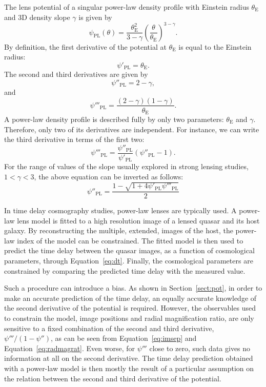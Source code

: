 \documentclass[usenatbib]{mnras}
\def\psiii{\psi''}
\def\psiiii{\psi'''}
\def\tein{\theta_{\mathrm{E}}}
\def\Sref#1{Section~\ref{#1}\xspace}
\def\Eref#1{Equation~\ref{#1}\xspace}
\begin{document}
The lens potential of a singular power-law density profile with Einstein radius $\tein$ and 3D density slope $\gamma$ is given by
\begin{equation}
\psi_{\mathrm{PL}}(\theta) = \frac{\tein^2}{3-\gamma}\left(\frac{\theta}{\tein}\right)^{3-\gamma}.
\end{equation}
By definition, the first derivative of the potential at $\tein$ is equal to the Einstein radius: 
\begin{equation}
\psi'_{\mathrm{PL}} = \tein.
\end{equation}
The second and third derivatives are given by
\begin{equation}\label{eq:psiiipl}
\psi''_{\mathrm{PL}} = 2 - \gamma,
\end{equation}
and
\begin{equation}
\psi'''_{\mathrm{PL}} = \frac{(2-\gamma)(1-\gamma)}{\tein}.
\end{equation}
A power-law density profile is described fully by only two parameters: $\tein$ and $\gamma$. Therefore, only two of its derivatives are independent. For instance, we can write the third derivative in terms of the first two:
\begin{equation}
\psi'''_{\mathrm{PL}} = \frac{\psi''_{\mathrm{PL}}}{\psi'_{\mathrm{PL}}}(\psi''_{\mathrm{PL}} - 1).
\end{equation}
For the range of values of the slope usually explored in strong lensing studies, $1 < \gamma < 3$, the above equation can be inverted as follows:
\begin{equation}\label{eq:psiiipl_given_psiiii}
\psi''_{\mathrm{PL}} = \frac{1 - \sqrt{1 + 4\psi'_{\mathrm{PL}}\psiiii_{\mathrm{PL}}}}{2}
\end{equation}

In time delay cosmography studies, power-law lenses are typically used.
A power-law lens model is fitted to a high resolution image of a lensed quasar and its host galaxy. By reconstructing the multiple, extended, images of the host, the power-law index of the model can be constrained.
The fitted model is then used to predict the time delay between the quasar images, as a function of cosmological parameters, through \Eref{eq:dt}. Finally, the cosmological parameters are constrained by comparing the predicted time delay with the measured value.

Such a procedure can introduce a bias. As shown in \Sref{sect:pot}, in order to make an accurate prediction of the time delay, an equally accurate knowledge of the second derivative of the potential is required. However, the observables used to constrain the model, image positions and radial magnification ratio, are only sensitive to a fixed combination of the second and third derivative, $\psiiii/(1-\psiii)$, as can be seen from \Eref{eq:imsep} and \Eref{eq:radmagrat}.
Even worse, for $\psiiii$ close to zero, such data gives no information at all on the second derivative.
The time delay prediction obtained with a power-law model is then mostly the result of a particular assumption on the relation between the second and third derivative of the potential.
\end{document}

